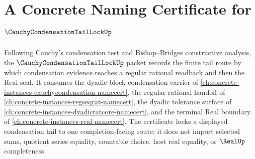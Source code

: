 \chapter{A Concrete Naming Certificate for $\CauchyCondensationTailLockUp$}
\label{ch:concrete-instances-cauchy-condensation-tail-lock-namecert}

Following Cauchy's condensation test and Bishop--Bridges constructive analysis, the $\CauchyCondensationTailLockUp$ packet records the finite tail route by which condensation evidence reaches a regular rational readback and then the Real seal. It consumes the dyadic-block condensation carrier of \autoref{ch:concrete-instances-cauchycondensation-namecert}, the regular rational handoff of \autoref{ch:concrete-instances-regseqrat-namecert}, the dyadic tolerance surface of \autoref{ch:concrete-instances-dyadicratcore-namecert}, and the terminal Real boundary of \autoref{ch:concrete-instances-real-namecert}. The certificate locks a displayed condensation tail to one completion-facing route; it does not import selected sums, quotient series equality, countable choice, host real equality, or $\RealUp$ completeness.

